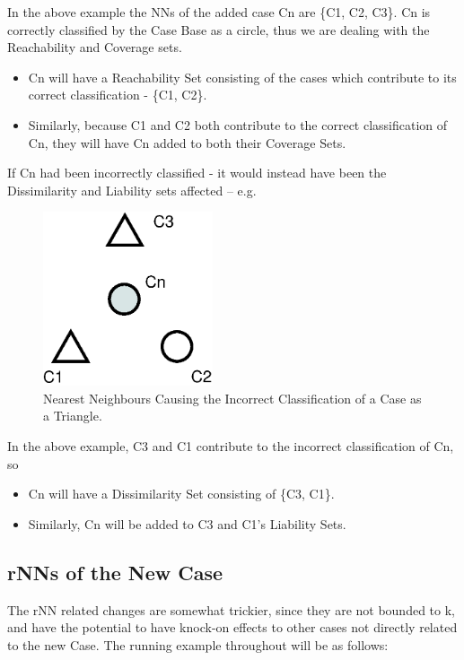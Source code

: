 \documentclass[a4paper,11pt]{report}
\begin{document}
In the above example the NNs of the added case Cn are \{C1, C2, C3\}. Cn is correctly classified by the Case Base as a circle, thus we are dealing with the Reachability and Coverage sets.
\begin{itemize}
	\item Cn will have a Reachability Set consisting of the cases which contribute to its correct classification - \{C1, C2\}.
	\item Similarly, because C1 and C2 both contribute to the correct classification of Cn, they will have Cn added to both their Coverage Sets.
\end{itemize}

If Cn had been incorrectly classified - it would instead have been the Dissimilarity and Liability sets affected – e.g.

\begin{figure}[h!]
  \centering
	\includegraphics[width=5cm]{./Drawn/NNsIncorrectlyClassify}
\caption{Nearest Neighbours Causing the Incorrect Classification of a Case as a Triangle.}

\end{figure}

In the above example, C3 and C1 contribute to the incorrect classification of Cn, so
\begin{itemize}
	\item Cn will have a Dissimilarity Set consisting of \{C3, C1\}.
	\item Similarly, Cn will be added to C3 and C1's Liability Sets.
\end{itemize}

\subsection{rNNs of the New Case}
The rNN related changes are somewhat trickier, since they are not bounded to k, and have the potential to have knock-on effects to other cases not directly related to the new Case.
The running example throughout will be as follows:
\end{document}
